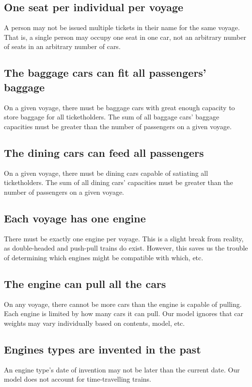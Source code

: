 \documentclass[a4paper]{article}
\begin{document}
\subsection*{One seat per individual per voyage}
A person may not be issued multiple tickets in their name for the same voyage. That is, a single person may occupy one seat in one car, not an arbitrary number of seats in an arbitrary number of cars. 

\subsection*{The baggage cars can fit all passengers’ baggage}
On a given voyage, there must be baggage cars with great enough capacity to store baggage for all ticketholders. The sum of all baggage cars’ baggage capacities must be greater than the number of passengers on a given voyage.

\subsection*{The dining cars can feed all passengers}
On a given voyage, there must be dining cars capable of satiating all ticketholders. The sum of all dining cars’ capacities must be greater than the number of passengers on a given voyage.

\subsection*{Each voyage has one engine}
There must be exactly one engine per voyage. This is a slight break from reality, as double-headed and push-pull trains do exist. However, this saves us the trouble of determining which engines might be compatible with which, etc.

\subsection*{The engine can pull all the cars}
On any voyage, there cannot be more cars than the engine is capable of pulling. Each engine is limited by how many cars it can pull. Our model ignores that car weights may vary individually based on contents, model, etc.

\subsection*{Engines types are invented in the past}
An engine type’s date of invention may not be later than the current date. Our model does not account for time-travelling trains.
\end{document}
